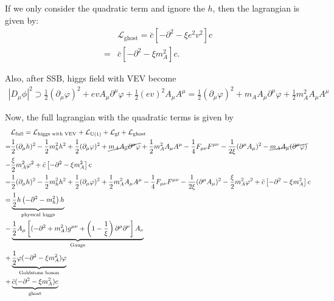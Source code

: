 If we only consider the quadratic term and ignore the $h$, then the lagrangian is given by:
\begin{align}
    &\mathcal{L}_{\text{ghost}} = \bar{c} \left[ -\partial^2 - \xi e^2 v^2\right] c\\
    =&\bar{c} \left[ -\partial^2 - \xi  m_A^2 \right] c.
\end{align}

Also, after SSB, higgs field with VEV become 
\begin{align}
    |D_\mu \phi|^2 \supset \frac{1}{2}(\partial_\mu \varphi)^2 + ev A_\mu \partial^\mu \varphi + \frac{1}{2}(ev)^2 A_\mu A^\mu=\frac{1}{2}(\partial_\mu \varphi)^2 + m_A A_\mu \partial^\mu \varphi + \frac{1}{2}m_A^2 A_\mu A^\mu
\end{align}


Now, the full lagrangian with the quadratic terms is given by 
\begin{align}
    &\mathcal{L}_\text{full} = \mathcal{L}_\text{higgs with VEV}+ \mathcal{L}_\text{U$(1)$} +\mathcal{L}_\text{gf}+\mathcal{L}_\text{ghost}\\
    =&\frac{1}{2} (\partial_\mu h)^2 -\frac{1}{2}m_h^2h^2+ \frac{1}{2}(\partial_\mu \varphi)^2 + \cancel{m_A A_\mu \partial^\mu \varphi} + \frac{1}{2}m_A^2 A_\mu A^\mu  -\frac{1}{4} F_{\mu\nu}F^{\mu\nu} -\frac{1}{2\xi}(\partial^\mu A_\mu)^2 -\cancel{ m_A A_\mu (\partial^\mu \varphi )} \\
    -& \frac{\xi}{2} m_A^2 \varphi^2 + \bar{c} \left[ -\partial^2 - \xi  m_A^2 \right] c\\
    =&\frac{1}{2} (\partial_\mu h)^2 -\frac{1}{2}m_h^2h^2+\frac{1}{2}(\partial_\mu \varphi)^2 + \frac{1}{2}m_A^2 A_\mu A^\mu -\frac{1}{4} F_{\mu\nu}F^{\mu\nu} -\frac{1}{2\xi}(\partial^\mu A_\mu)^2 - \frac{\xi}{2} m_A^2 \varphi^2 + \bar{c} \left[ -\partial^2 - \xi  m_A^2 \right] c\\
    =&\underbrace{\frac{1}{2}h\left(-\partial^2-m_h^2\right)h}_{\text{physical higgs}}\\
    -& \underbrace{\frac{1}{2} A_\mu \left[ (-\partial^2 + m_A^2)g^{\mu\nu} + \left(1 - \frac{1}{\xi}\right)\partial^\mu \partial^\nu \right] A_\nu}_{\text{Gauge}} \\
     +& \underbrace{\frac{1}{2} \varphi (-\partial^2 - \xi m_A^2) \varphi}_{\text{Goldstone boson}} \\
     +& \underbrace{\bar{c} (-\partial^2 - \xi m_A^2) c}_{\text{ghost}}
\end{align}


